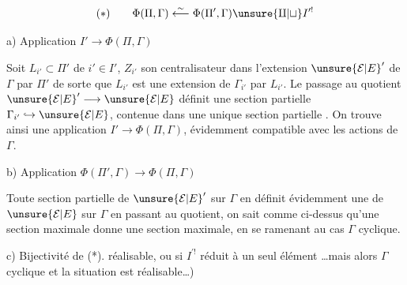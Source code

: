 \[
(*)\qquad\Phi(\Pi,\Gamma)\overset{\sim}{\longleftarrow}
\Phi(\Pi',\Gamma)\unsure{\amalg|\sqcup} I^{\prime!}
\]

a) Application $I'\longrightarrow\Phi(\Pi,\Gamma)$

Soit $L_{i'}\subset\Pi'$ de  $i'\in I'$, $Z_{i'}$ son centralisateur dans l'extension $\unsure{\mathcal E|E}'$ de $\Gamma$ par $\Pi'$
de sorte que $L_{i'}$ est une extension de $\Gamma_{i'}$
par $L_{i'}$. Le passage au quotient $\unsure{\mathcal E|E}'\longrightarrow\unsure{\mathcal E|E}$
définit une section partielle $\Gamma_{i'}\hookrightarrow\unsure{\mathcal E|E}$,
contenue dans une unique section partielle 
.
On trouve ainsi une application $I'\longrightarrow\Phi(\Pi,\Gamma)$,
évidemment compatible avec les actions de $\Gamma$.

b) Application $\Phi(\Pi',\Gamma)\longrightarrow\Phi(\Pi,\Gamma)$

Toute section partielle  de $\unsure{\mathcal E|E}'$ sur $\Gamma$ en définit
évidemment une de $\unsure{\mathcal E|E}$ sur $\Gamma$ en passant au
quotient, on sait comme ci-dessus qu'une
section maximale donne une section maximale,
en se ramenant au cas $\Gamma$ cyclique.

c) Bijectivité de (*).  
réalisable, ou si $I^{\prime!}$ réduit à un seul élément
\ldots mais alors $\Gamma$ cyclique et la situation est réalisable\ldots)
